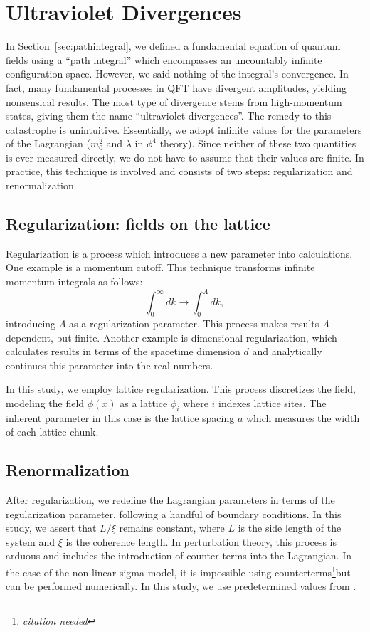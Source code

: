 \documentclass[12pt]{report}
\newcommand{\citeneeded}{\footnote{\textit{citation needed}}}
\begin{document}
\section{Ultraviolet Divergences}

In Section~\ref{sec:pathintegral},  we defined a fundamental equation of quantum fields using a ``path integral'' which encompasses an uncountably infinite configuration space. However, we said nothing of the integral's convergence. In fact, many fundamental processes in QFT have divergent amplitudes, yielding nonsensical results. The most type of divergence stems from high-momentum states, giving them the name ``ultraviolet divergences''. The remedy to this catastrophe is unintuitive. Essentially, we adopt infinite values for the parameters of the Lagrangian ($m_0^2$ and $\lambda$ in $\phi^4$ theory). Since neither of these two quantities is ever measured directly, we do not have to assume that their values are finite. In practice, this technique is involved and consists of two steps: regularization and renormalization.

\subsection{Regularization: fields on the lattice}
Regularization is a process which introduces a new parameter into calculations. One example is a momentum cutoff. This technique transforms infinite momentum integrals as follows:  
\begin{equation*}
    \int_0^\infty dk \rightarrow \int_0^\Lambda dk,
\end{equation*}
introducing $\Lambda$ as a regularization parameter. This process makes results $\Lambda$-dependent, but finite. Another example is dimensional regularization, which calculates results in terms of the spacetime dimension $d$ and analytically continues this parameter into the real numbers. 

In this study, we employ lattice regularization. This process discretizes the field, modeling the field $\phi(x)$ as a lattice $\phi_i$ where $i$ indexes lattice sites. The inherent parameter in this case is the lattice spacing $a$ which measures the width of each lattice chunk.

\subsection{Renormalization}
After regularization, we redefine the Lagrangian parameters in terms of the regularization parameter, following a handful of boundary conditions. In this study, we assert that $L/\xi$ remains constant, where $L$ is the side length of the system and $\xi$ is the coherence length. In perturbation theory, this process is arduous and includes the introduction of counter-terms into the Lagrangian. In the case of the non-linear sigma model, it is impossible using counterterms\citeneeded but can be performed numerically. In this study, we use predetermined values from \cite{bietenholz2018}.
\end{document}

